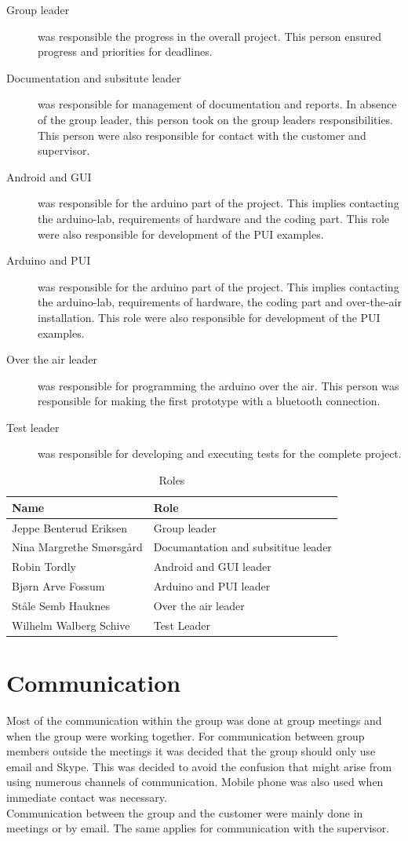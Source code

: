 \begin{description}
	\item[Group leader]{was responsible the progress in the overall project. This person ensured progress and priorities for deadlines.}
	\item[Documentation and subsitute leader]{was responsible for management of documentation and reports. In absence of the group leader, this person took on the group leaders responsibilities. This person were also responsible for contact with the customer and supervisor.}
	\item[Android and GUI]{was responsible for the arduino part of the project. This implies contacting the arduino-lab, requirements of hardware and the coding part. This role were also responsible for development of the PUI examples.}
	\item[Arduino and PUI]{was responsible for the arduino part of the project. This implies contacting the arduino-lab, requirements of hardware, the coding part and over-the-air installation. This role were also responsible for development of the PUI examples.}
	\item[Over the air leader]{was responsible for programming the arduino over the air. This person was responsible for making the first prototype with a bluetooth connection.}
	\item[Test leader]{was responsible for developing and executing tests for the complete project.}
\end{description}

\begin{table}
\begin{tabular}{|l|l|}
\hline
	{\bf Name} & {\bf Role}\\
\hline
	Jeppe Benterud Eriksen & Group leader\\
\hline
	Nina Margrethe Smørsgård & Documantation and subsititue leader\\
\hline
	Robin Tordly & Android and GUI leader\\
\hline
	Bjørn Arve Fossum & Arduino and PUI leader\\
\hline
	Ståle Semb Hauknes & Over the air leader\\
\hline
	Wilhelm Walberg Schive & Test Leader\\
\hline
\end{tabular}
\caption{Roles}
\end{table}

\section{Communication}
Most of the communication within the group was done at group meetings and when the group were working together. For communication between group members outside the meetings it was decided that the group should only use email and Skype. This was decided to avoid the confusion that might arise from using numerous channels of communication. Mobile phone was also used when immediate contact was necessary.\\
\newline
Communication between the group and the customer were mainly done in meetings or by email. The same applies for communication with the supervisor.


